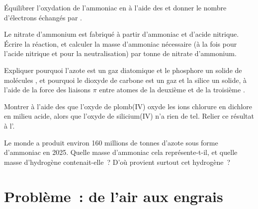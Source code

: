 \begin{exercise}[$\star\star$]\label{exo:b1:p-block-13-15:8}
Équilibrer l'oxydation de l'ammoniac en  à l'aide des  et donner le nombre d'électrons échangés par .
\end{exercise}

\begin{exercise}[$\star\star$]\label{exo:b1:p-block-13-15:9}
Le nitrate d'ammonium est fabriqué à partir d'ammoniac et d'acide
nitrique. Écrire la réaction, et calculer la masse d'ammoniac nécessaire
(à la fois pour l'acide nitrique et pour la neutralisation) par tonne de
nitrate d'ammonium.
\end{exercise}

\begin{exercise}[$\star\star\star$]\label{exo:b1:p-block-13-15:10}
Expliquer pourquoi l'azote est un gaz diatomique et le phosphore un
solide de molécules , et pourquoi le dioxyde de carbone est un
gaz et la silice un solide, à l'aide de la force des liaisons $\pi$
entre atomes de la deuxième et de la troisième .
\end{exercise}

\begin{exercise}[$\star\star\star$]\label{exo:b1:p-block-13-15:11}
Montrer à l'aide des  que l'oxyde de plomb(IV) oxyde
les ions chlorure en dichlore en milieu acide, alors que l'oxyde de
silicium(IV) n'a rien de tel. Relier ce résultat à l'.
\end{exercise}

\begin{exercise}[$\star\star\star$]\label{exo:b1:p-block-13-15:12}
Le monde a produit environ 160 millions de tonnes d'azote sous forme
d'ammoniac en 2025. Quelle masse d'ammoniac cela représente-t-il, et
quelle masse d'hydrogène contenait-elle~? D'où provient surtout cet
hydrogène~?
\end{exercise}

\section{Problème~: de l'air aux engrais}


